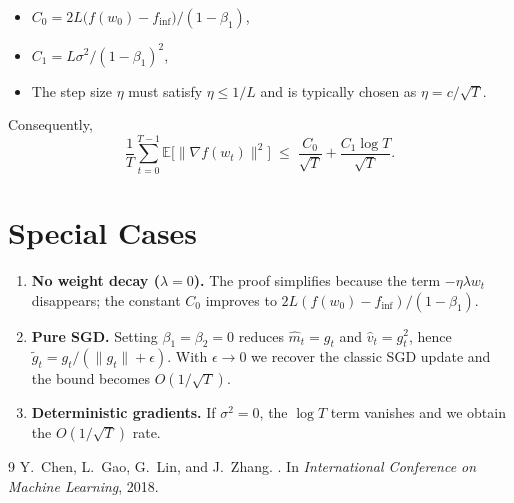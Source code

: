 \documentclass{article}
\newcommand{\E}{\mathbb{E}}
\begin{document}
\begin{itemize}
  \item $C_{0}=2L\bigl(f(w_{0})-f_{\inf}\bigr)/(1-\beta_{1})$,
  \item $C_{1}=L\sigma^{2}/(1-\beta_{1})^{2}$,
  \item The step size $\eta$ must satisfy $\eta\le 1/L$ and is typically chosen as $\eta=c/\sqrt{T}$.
\end{itemize}
Consequently,
\[
\boxed{
\frac{1}{T}\sum_{t=0}^{T-1}\E\!\bigl[\|\nabla f(w_{t})\|^{2}\bigr]
\;\le\;
\frac{C_{0}}{\sqrt{T}}+\frac{C_{1}\log T}{\sqrt{T}} }.
\]

\section*{Special Cases}
\begin{enumerate}
  \item \textbf{No weight decay ($\lambda=0$).} The proof simplifies because the term $-\eta\lambda w_{t}$ disappears; the constant $C_{0}$ improves to $2L(f(w_{0})-f_{\inf})/(1-\beta_{1})$.
  \item \textbf{Pure SGD.} Setting $\beta_{1}=\beta_{2}=0$ reduces $\hat m_{t}=g_{t}$ and $\hat v_{t}=g_{t}^{2}$, hence $\tilde g_{t}=g_{t}/(\|g_{t}\|+\epsilon)$. With $\epsilon\to0$ we recover the classic SGD update and the bound becomes $O(1/\sqrt{T})$.
  \item \textbf{Deterministic gradients.} If $\sigma^{2}=0$, the $\log T$ term vanishes and we obtain the $O(1/\sqrt{T})$ rate.
\end{enumerate}

\begin{thebibliography}{9}
Y.~Chen, L.~Gao, G.~Lin, and J.~Zhang.
.
\newblock In \emph{International Conference on Machine Learning}, 2018.
\end{thebibliography}
\end{document}
